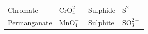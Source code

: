 {{\begin{center}
\begin{xtabular}[t]{|l|l|l|l|}
    
        Chromate &
    
    
        \begin{math}\mathrm{CrO}_{4}^{2-}\end{math} &
    
    
        Sulphide &
    
    
        \begin{math}{\mathrm{S}}^{2-}\end{math}%
     \tabularnewline{}
    
    
        Permanganate &
    
    
        \begin{math}\mathrm{MnO}_{4}^{-}\end{math} &
    
    
        Sulphite &
    
    
        \begin{math}\mathrm{SO}_{3}^{2-}\end{math}%
     \tabularnewline{}
    

\end{xtabular}
\end{center}}}
